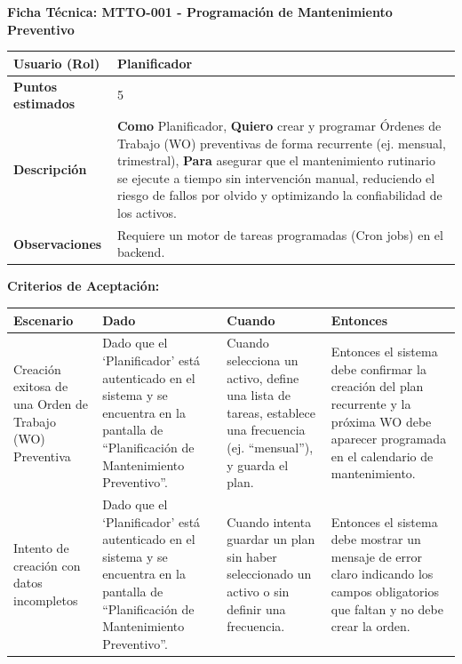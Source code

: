 \noindent
\textbf{Ficha Técnica: MTTO-001 - Programación de Mantenimiento Preventivo}
\footnotesize
\begin{longtable}{|p{}|p{}|}
\hline
\textbf{Usuario (Rol)} & Planificador \\ \hline
\textbf{Puntos estimados} & 5 \\ \hline
\textbf{Descripción} & \textbf{Como} Planificador, \textbf{Quiero} crear y programar Órdenes de Trabajo (WO) preventivas de forma recurrente (ej. mensual, trimestral), \textbf{Para} asegurar que el mantenimiento rutinario se ejecute a tiempo sin intervención manual, reduciendo el riesgo de fallos por olvido y optimizando la confiabilidad de los activos. \\ \hline
\textbf{Observaciones} & Requiere un motor de tareas programadas (Cron jobs) en el backend. \\ \hline
\end{longtable}
\normalsize

\noindent
\textbf{Criterios de Aceptación:}
\footnotesize
\begin{longtable}{|p{}|p{}|p{}|p{}|}
\hline
\textbf{Escenario} & \textbf{Dado} & \textbf{Cuando} & \textbf{Entonces} \\ \hline
\endhead
Creación exitosa de una Orden de Trabajo (WO) Preventiva & Dado que el `Planificador' está autenticado en el sistema y se encuentra en la pantalla de ``Planificación de Mantenimiento Preventivo''. & Cuando selecciona un activo, define una lista de tareas, establece una frecuencia (ej. ``mensual''), y guarda el plan. & Entonces el sistema debe confirmar la creación del plan recurrente y la próxima WO debe aparecer programada en el calendario de mantenimiento. \\ \hline
Intento de creación con datos incompletos & Dado que el `Planificador' está autenticado en el sistema y se encuentra en la pantalla de ``Planificación de Mantenimiento Preventivo''. & Cuando intenta guardar un plan sin haber seleccionado un activo o sin definir una frecuencia. & Entonces el sistema debe mostrar un mensaje de error claro indicando los campos obligatorios que faltan y no debe crear la orden. \\ \hline
\end{longtable}
\normalsize


